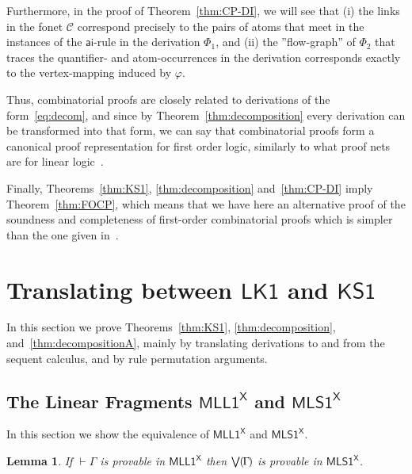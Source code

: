\documentclass[conference,twosided,10pt]{IEEEtran}
\newtheorem{lemma}[thm]{Lemma}
\theoremstyle{definition}
\newcommand{\graph}[1]{\mathcal{#1}}
\newcommand{\gC}{\graph{C}}
\newcommand{\Deri}{\Phi}
\newcommand*{\FOLK}{\mathsf{LK1}}
\newcommand*{\FOMLL}{\mathsf{MLL1^X}}
\newcommand*{\FOKS}{\mathsf{KS1}}
\newcommand*{\FOMLS}{\mathsf{MLS1^X}}
\newcommand\aiD {\mathsf{ai}}
\newcommand{\sqn}[1]{\vdash#1}
\newcommand{\form}[1]{\bigvee\mkern-1mu(\mkern-2mu #1\mkern-2mu)}
\renewcommand{\phi}{\varphi}
\begin{document}
Furthermore, in the proof of Theorem~\ref{thm:CP-DI}, we will see that
(i) the links in the fonet $\gC$ correspond precisely to the pairs of
atoms that meet in the instances of the $\aiD$-rule in the derivation
$\Deri_1$, and (ii) the ''flow-graph'' of $\Deri_2$ that traces the
quantifier- and atom-occurrences in the derivation corresponds exactly
to the vertex-mapping induced by $\phi$.

Thus, combinatorial proofs are closely related to derivations of the
form~\eqref{eq:decom}, and since by Theorem~\ref{thm:decomposition}
every derivation can be transformed into that form, we can say that
combinatorial proofs form a canonical proof representation for first
order logic, similarly to what proof nets are for linear
logic~\cite{girard:96:PN}.

Finally, Theorems~\ref{thm:KS1}, \ref{thm:decomposition}
and~\ref{thm:CP-DI} imply Theorem~\ref{thm:FOCP}, which means that we
have here an alternative proof of the soundness and completeness of
first-order combinatorial proofs which is simpler than the one given
in~\cite{hughes:fopws}.




\section{Translating between $\FOLK$ and $\FOKS$}
\label{sec:LK1-KS1}

In this section we prove Theorems~\ref{thm:KS1},
\ref{thm:decomposition}, and~\ref{thm:decompositionA}, mainly by
translating derivations to and from the sequent calculus, and by rule
permutation arguments.

\subsection{The Linear Fragments $\FOMLL$ and $\FOMLS$}

In this section we show the equivalence of $\FOMLL$ and $\FOMLS$.

\begin{lemma}\label{lem:MLL1->MLS1}
  If $\sqn\Gamma$ is provable in $\FOMLL$ then $\form\Gamma$ is provable in  $\FOMLS$.
\end{lemma}
\end{document}
